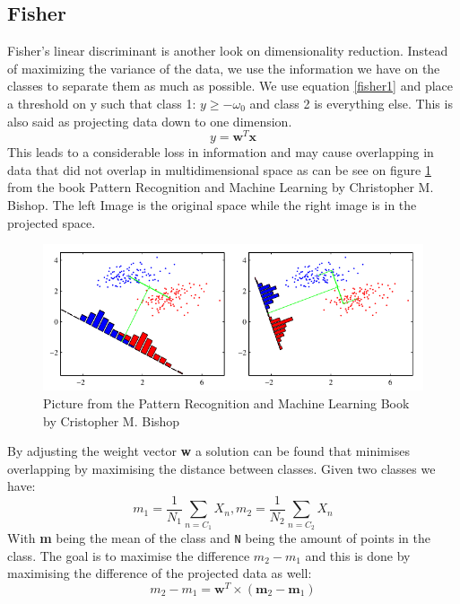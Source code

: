 \subsection{Fisher}
Fisher's linear discriminant is another look on dimensionality reduction. Instead of maximizing the variance of the data, we use the information we have on the classes to separate them as much as possible. We use equation \ref{fisher1} and place a threshold on y such that class 1: $y\geqslant -\omega_0$ and class 2 is everything else. This is also said as projecting data down to one dimension.
\begin{equation}
\label{fisher1}
y = \textbf{w}^T\textbf{x}
\end{equation}
This leads to a considerable loss in information and may cause overlapping in data that did not overlap in multidimensional space as can be see on figure \ref{fig:fisherfrombook} from the book Pattern Recognition and Machine Learning by Christopher M. Bishop\cite{bishop2006pattern}. The left Image is  the original space while the right image is in the projected space.\\
\begin{figure}[H]
\centering
\includegraphics[width=1\textwidth]{billeder/fisherfrombook}
\caption{Picture from the Pattern Recognition and Machine Learning Book by Cristopher M. Bishop}
\label{fig:fisherfrombook}
\end{figure}
By adjusting the weight vector \textbf{w} a solution can be found that minimises overlapping by maximising the distance between classes. Given two classes we have:
\begin{equation}
m_1 = \frac{1}{N_1} \sum_{n=C_1} X_n,       m_2 = \frac{1}{N_2} \sum_{n=C_2} X_n
\end{equation}
With \textbf{m} being the mean of the class and \texttt{N} being the amount of points in the class. The goal is to maximise the difference $m_2 - m_1$ and this is done by maximising the difference of the projected data as well:
\begin{equation}
m_2 - m_1 = \textbf{w}^{T} \times ( \textbf{m}_2 - \textbf{m}_1 )
\end{equation}
